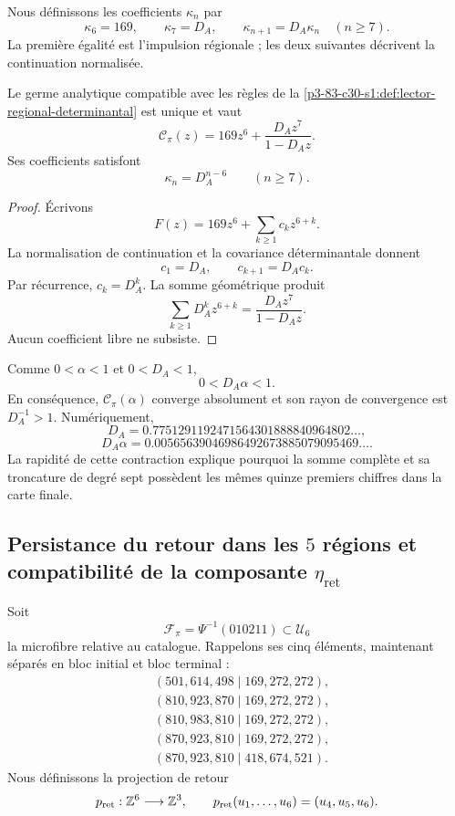 
Nous définissons les coefficients \(\kappa_n\) par
\[
\kappa_6=169,
\qquad
\kappa_7=D_A,
\qquad
\kappa_{n+1}=D_A\kappa_n\quad(n\ge7).
\]
La première égalité est l'impulsion régionale ; les deux suivantes décrivent la
continuation normalisée.

\begin{theorem}
\label{p3-83-c30-s1:thm:realizacion-analitica-graduada}
Le germe analytique compatible avec les règles de la
\cref{p3-83-c30-s1:def:lector-regional-determinantal} est unique et vaut
\[
\boxed{
\mathscr C_\pi(z)
=169z^6+\frac{D_Az^7}{1-D_Az}.}
\]
Ses coefficients satisfont
\[
\kappa_n=D_A^{n-6}\qquad(n\ge7).
\]
\end{theorem}

\begin{proof}
Écrivons
\[
F(z)=169z^6+\sum_{k\ge1}c_kz^{6+k}.
\]
La normalisation de continuation et la covariance déterminantale donnent
\[
c_1=D_A,
\qquad
c_{k+1}=D_Ac_k.
\]
Par récurrence, \(c_k=D_A^k\). La somme géométrique produit
\[
\sum_{k\ge1}D_A^kz^{6+k}
=\frac{D_Az^7}{1-D_Az}.
\]
Aucun coefficient libre ne subsiste.
\end{proof}

Comme \(0<\alpha<1\) et
\(0<D_A<1\),
\[
0<D_A\alpha<1.
\]
En conséquence, \(\mathscr C_\pi(\alpha)\) converge absolument et son
rayon de convergence est \(D_A^{-1}>1\). Numériquement,
\[
D_A=0.7751291192471564301888840964802\ldots,
\]
\[
D_A\alpha=0.00565639046986492673885079095469\ldots.
\]
La rapidité de cette contraction explique pourquoi la somme complète et sa
troncature de degré sept possèdent les mêmes quinze premiers chiffres dans la
carte finale.

\subsection{Persistance du retour dans les \texorpdfstring{\(5\)}{5} régions et compatibilité de la composante \texorpdfstring{\(\eta_{\mathrm{ret}}\)}{eta_ret}}
\label{sec:s102:c38:2:5}


Soit
\[
\mathcal F_\pi=\Psi^{-1}(010211)\subset\mathcal U_6
\]
la microfibre relative au catalogue. Rappelons ses cinq éléments, maintenant séparés en bloc initial et bloc terminal :
\[
\begin{aligned}
 &(501,614,498\mid169,272,272),\\
 &(810,923,870\mid169,272,272),\\
 &(810,983,810\mid169,272,272),\\
 &(870,923,810\mid169,272,272),\\
 &(870,923,810\mid418,674,521).
\end{aligned}
\]
Nous définissons la projection de retour
\[
p_{\rm ret}:\mathbb Z^6\longrightarrow\mathbb Z^3,
\qquad
p_{\rm ret}(u_1,\ldots,u_6)=(u_4,u_5,u_6).
\]

